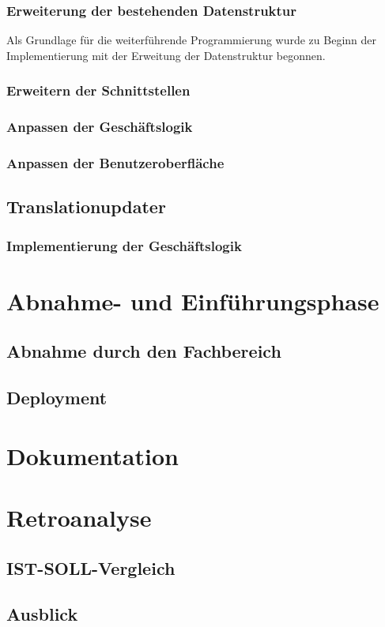 \documentclass[10pt, oneside]{article}
\begin{document}
  \subsubsection{Erweiterung der bestehenden Datenstruktur}
    Als Grundlage für die weiterführende Programmierung wurde zu Beginn der Implementierung mit der Erweitung der Datenstruktur begonnen.  
  \subsubsection{Erweitern der Schnittstellen}
  \subsubsection{Anpassen der Geschäftslogik}
  \subsubsection{Anpassen der Benutzeroberfläche}
  \subsection{Translationupdater}
  \subsubsection{Implementierung der Geschäftslogik}
  \section{Abnahme- und Einführungsphase}
  \subsection{Abnahme durch den Fachbereich}
  \subsection{Deployment}
  \section{Dokumentation}
  \section{Retroanalyse}
  \subsection{IST-SOLL-Vergleich}
  \subsection{Ausblick}
  \setcounter{section}{0}
  \renewcommand{\thesection}{\MakeUppercase{\alph{section}}}
\end{document}
